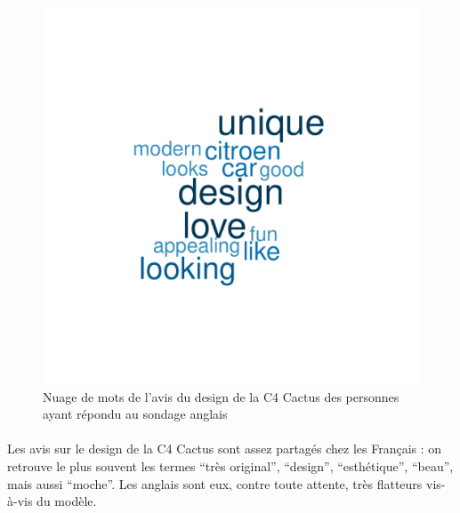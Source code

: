 \documentclass[12pt]{article}\usepackage[]{graphicx}\usepackage[]{color}
\makeatletter
\def\maxwidth{ %
  \ifdim\Gin@nat@width>\linewidth
    \linewidth
  \else
    \Gin@nat@width
  \fi
}
\newenvironment{knitrout}{}{} %
\makeatother
\begin{document}
\begin{knitrout}
\color{fgcolor}\begin{figure}[H]
\includegraphics[width=\maxwidth]{figure/design_en-1} \caption[Nuage de mots de l'avis du design de la C4 Cactus des personnes ayant répondu au sondage anglais]{Nuage de mots de l'avis du design de la C4 Cactus des personnes ayant répondu au sondage anglais}\label{fig:design en}
\end{figure}


\end{knitrout}

\paragraph{} Les avis sur le design de la C4 Cactus sont assez partagés chez
les Français : on retrouve le plus souvent les termes ``très original'',
``design'', ``esthétique'', ``beau'', mais aussi ``moche''. Les anglais sont
eux, contre toute attente, très flatteurs vis-à-vis du modèle.
\end{document}
